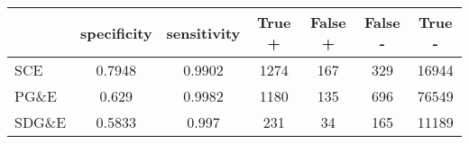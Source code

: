 \begin{tabular}{lcccccc}
\toprule
{} &  specificity &  sensitivity &  True + &  False + &  False - &  True - \\
\midrule
SCE   &       0.7948 &       0.9902 &    1274 &      167 &      329 &   16944 \\
PG\&E  &        0.629 &       0.9982 &    1180 &      135 &      696 &   76549 \\
SDG\&E &       0.5833 &        0.997 &     231 &       34 &      165 &   11189 \\
\bottomrule
\end{tabular}
